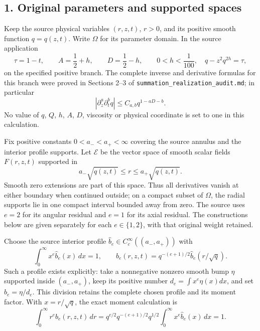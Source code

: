 \documentclass[10pt,a4paper]{article}
\begin{document}
\subsection{1. Original parameters and supported spaces}\label{nsupstream:radial_stress_reconstruction_audit:original-parameters-and-supported-spaces}

Keep the source physical variables \((r,z,t)\), \(r>0\), and its positive smooth function \(q=q(z,t)\). Write \(\Omega\) for its parameter domain. In the source application \[
\tau=1-t,\qquad A=\frac12+h,\qquad D=\frac12-h,\qquad 0<h<\frac1{100},
\quad q-z^2q^{2h}=\tau,
\tag{R1}
\] on the specified positive branch. The complete inverse and derivative formulas for this branch were proved in Sections 2--3 of \texttt{s\allowbreak{}u\allowbreak{}m\allowbreak{}m\allowbreak{}a\allowbreak{}t\allowbreak{}i\allowbreak{}o\allowbreak{}n\allowbreak{}\_\allowbreak{}r\allowbreak{}e\allowbreak{}a\allowbreak{}l\allowbreak{}i\allowbreak{}z\allowbreak{}a\allowbreak{}t\allowbreak{}i\allowbreak{}o\allowbreak{}n\allowbreak{}\_\allowbreak{}a\allowbreak{}u\allowbreak{}d\allowbreak{}i\allowbreak{}t\allowbreak{}.\allowbreak{}m\allowbreak{}d}; in particular \[
|\partial_z^a\partial_t^bq|\le C_{a,b}q^{1-aD-b}.
\tag{R2}
\] No value of \(q\), \(Q\), \(h\), \(A\), \(D\), viscosity or physical coordinate is set to one in this calculation.

Fix positive constants \(0<a_-<a_+<\infty\) covering the source annulus and the interior profile supports. Let \(\mathcal E\) be the vector space of smooth scalar fields \(F(r,z,t)\) supported in \[
a_-\sqrt{q(z,t)}\le r\le a_+\sqrt{q(z,t)}.
\tag{R3}
\] Smooth zero extensions are part of this space. Thus all derivatives vanish at either boundary when continued outside; on a compact subset of \(\Omega\), the radial supports lie in one compact interval bounded away from zero. The source uses \(e=2\) for its angular residual and \(e=1\) for its axial residual. The constructions below are given separately for each \(e\in\{1,2\}\), with that original weight retained.

Choose the source interior profile \(\widehat b_e\in C_c^\infty((a_-,a_+))\) with \[
\int_0^\infty x^e\widehat b_e(x)\,dx=1,
\qquad
b_e(r,z,t)=q^{-(e+1)/2}\widehat b_e(r/\sqrt q).
\tag{R4}
\] Such a profile exists explicitly: take a nonnegative nonzero smooth bump \(\eta\) supported inside \((a_-,a_+)\), keep its positive number \(d_e=\int x^e\eta(x)dx\), and set \(\widehat b_e=\eta/d_e\). This division retains the complete chosen profile and its moment factor. With \(x=r/\sqrt q\), the exact moment calculation is \[
\int_0^\infty r^eb_e(r,z,t)\,dr
=q^{e/2}q^{-(e+1)/2}q^{1/2}\int_0^\infty x^e\widehat b_e(x)\,dx=1.
\tag{R5}
\]
\end{document}
